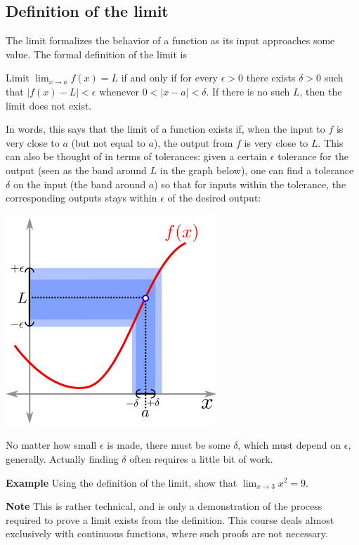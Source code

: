 \documentclass[twoside,openright,titlepage,a4paper]{book}
\begin{document}
\begin{sloppypar}
\subsection{Definition of the limit}
The limit formalizes the behavior of a function as its input approaches some value. The formal definition of the limit is
\begin{examplebox}
Limit $\displaystyle \lim_{x \rightarrow a} f(x) = L$ if and only if for every $\epsilon>0$ there exists $\delta>0$ such that $|f(x)-L|<\epsilon$ whenever $0<|x-a|<\delta$. If there is no such $L$, then the limit does not exist.
\end{examplebox}
In words, this says that the limit of a function exists if, when the input to $f$ is very close to $a$ (but not equal to $a$), the output from $f$ is very close to $L$. This can also be thought of in terms of tolerances: given a certain $\epsilon$ tolerance for the output (seen as the band around $L$ in the graph below), one can find a tolerance $\delta$ on the input (the band around $a$) so that for inputs within the tolerance, the corresponding outputs stays within $\epsilon$ of the desired output:
\begin{center}\includegraphics[scale=0.6]{Limit}\end{center}

No matter how small $\epsilon$ is made, there must be some $\delta$, which must depend on $\epsilon$, generally. Actually finding $\delta$ often requires a little bit of work.

\textbf{Example} Using the definition of the limit, show that $\displaystyle \lim_{x \rightarrow 3} x^2 = 9$. 
\begin{examplebox}
\textbf{Note} This is rather technical, and is only a demonstration of the process required to prove a limit exists from the definition. This course deals almost exclusively with continuous functions, where such proofs are not necessary.


\end{examplebox}
\end{sloppypar}
\end{document}
